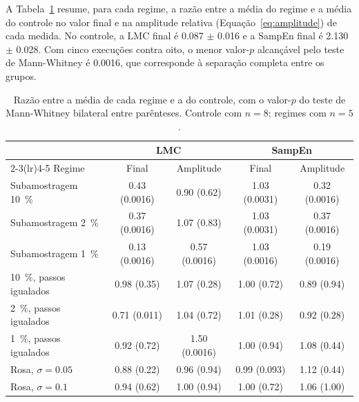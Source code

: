 A Tabela~\ref{tab:comparacao} resume, para cada regime, a razão entre a média
do regime e a média do controle no valor final e na amplitude relativa
(Equação~\ref{eq:amplitude}) de cada medida. No controle, a LMC final é
\num{0,087} $\pm$ \num{0,016} e a SampEn final é \num{2,130} $\pm$ \num{0,028}.
Com cinco execuções contra oito, o menor valor-$p$ alcançável pelo teste de
Mann-Whitney é \num{0,0016}, que corresponde à separação completa entre os
grupos.

\begin{table}[H]
    \centering
    \caption{Razão entre a média de cada regime e a do controle, com o
    valor-$p$ do teste de Mann-Whitney bilateral entre parênteses. Controle
    com $n = 8$; regimes com $n = 5$.}
    \label{tab:comparacao}
    \footnotesize
    \begin{tabular}{lcccc}
        \toprule
        & \multicolumn{2}{c}{LMC} & \multicolumn{2}{c}{SampEn} \\
        \cmidrule(lr){2-3}\cmidrule(lr){4-5}
        Regime & Final & Amplitude & Final & Amplitude \\
        \midrule
        Subamostragem \SI{10}{\percent} & \num{0,43} (\num{0,0016}) & \num{0,90} (\num{0,62}) & \num{1,03} (\num{0,0031}) & \num{0,32} (\num{0,0016}) \\
        Subamostragem \SI{2}{\percent}  & \num{0,37} (\num{0,0016}) & \num{1,07} (\num{0,83}) & \num{1,03} (\num{0,0031}) & \num{0,37} (\num{0,0016}) \\
        Subamostragem \SI{1}{\percent}  & \num{0,13} (\num{0,0016}) & \num{0,57} (\num{0,0016}) & \num{1,03} (\num{0,0016}) & \num{0,19} (\num{0,0016}) \\
        \midrule
        \SI{10}{\percent}, passos igualados & \num{0,98} (\num{0,35}) & \num{1,07} (\num{0,28}) & \num{1,00} (\num{0,72}) & \num{0,89} (\num{0,94}) \\
        \SI{2}{\percent}, passos igualados  & \num{0,71} (\num{0,011}) & \num{1,04} (\num{0,72}) & \num{1,01} (\num{0,28}) & \num{0,92} (\num{0,28}) \\
        \SI{1}{\percent}, passos igualados  & \num{0,92} (\num{0,72}) & \num{1,50} (\num{0,0016}) & \num{1,00} (\num{0,94}) & \num{1,08} (\num{0,44}) \\
        \midrule
        Rosa, $\sigma = \num{0,05}$   & \num{0,88} (\num{0,22}) & \num{0,96} (\num{0,94}) & \num{0,99} (\num{0,093}) & \num{1,12} (\num{0,44}) \\
        Rosa, $\sigma = \num{0,1}$    & \num{0,94} (\num{0,62}) & \num{1,00} (\num{0,94}) & \num{1,00} (\num{0,72}) & \num{1,06} (\num{1,00}) \\

\end{tabular}
\end{table}
